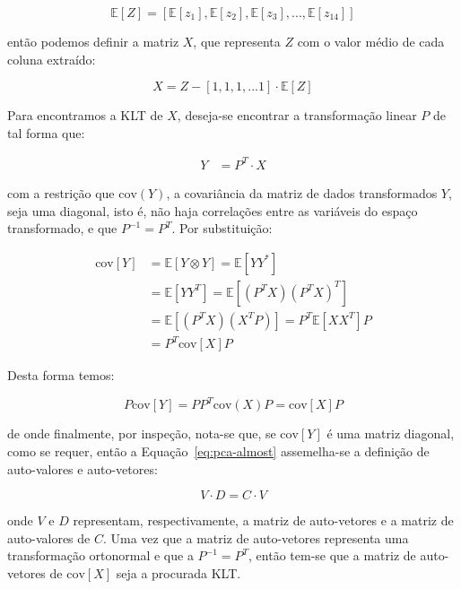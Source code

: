 \begin{equation}
\mathbb{E}[Z] = [\mathbb{E}[z_1], \mathbb{E}[z_2], \mathbb{E}[z_3], ...,
\mathbb{E}[z_{14}]]
\end{equation}

\noindent então podemos definir a matriz $X$, que representa $Z$ com o valor
médio de cada coluna extraído:

\begin{equation}
X = Z - [1, 1, 1, ... 1] \cdot \mathbb{E}[Z]
\end{equation}

Para encontramos a KLT de $X$, deseja-se encontrar a transformação linear $P$
de tal forma que:

\begin{align}
Y &= P^{T} \cdot X
\end{align}

\noindent com a restrição que $\text{cov}(Y)$, a covariância da matriz de
dados transformados $Y$, seja uma diagonal, isto é, não haja correlações entre
as variáveis do espaço transformado, e que $P^{-1} = P^{T}$. Por substituição:

\begin{align}
\text{cov}[Y] &= \mathbb{E}[Y \otimes Y] = \mathbb{E}[YY^{*}] \\
              &= \mathbb{E}[YY^T] = \mathbb{E}[(P^T X)(P^T X)^T] \\
              &= \mathbb{E}[(P^T X)(X^T P)] = P^T \mathbb{E}[XX^T] P \\
              &= P^T \text{cov}[X] P
\end{align}

Desta forma temos:

\begin{equation}
P\text{cov}[Y] = PP^T\text{cov}(X)P = \text{cov}[X]P
\label{eq:pca-almost}
\end{equation}

\noindent de onde finalmente, por inspeção, nota-se que, se $\text{cov}[Y]$ é
uma matriz diagonal, como se requer, então a Equação~\ref{eq:pca-almost}
assemelha-se a definição de auto-valores e auto-vetores:

\begin{equation}
V \cdot D = C \cdot V
\end{equation}

\noindent onde $V$ e $D$ representam, respectivamente, a matriz de
auto-vetores e a matriz de auto-valores de $C$. Uma vez que a matriz de
auto-vetores representa uma transformação ortonormal e que a $P^{-1} = P^T$,
então tem-se que a matriz de auto-vetores de $\text{cov}[X]$ seja a procurada
KLT. 

